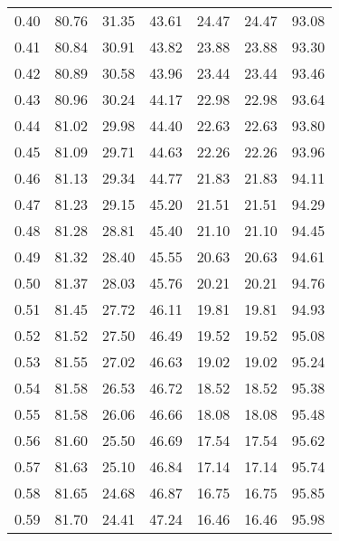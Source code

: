 \begin{tabular}{|c|c|c|c|c|c|c|}
      0.40 &     80.76 &     31.35 &      43.61 &   24.47 &      24.47 &         93.08 \\
      0.41 &     80.84 &     30.91 &      43.82 &   23.88 &      23.88 &         93.30 \\
      0.42 &     80.89 &     30.58 &      43.96 &   23.44 &      23.44 &         93.46 \\
      0.43 &     80.96 &     30.24 &      44.17 &   22.98 &      22.98 &         93.64 \\
      0.44 &     81.02 &     29.98 &      44.40 &   22.63 &      22.63 &         93.80 \\
      0.45 &     81.09 &     29.71 &      44.63 &   22.26 &      22.26 &         93.96 \\
      0.46 &     81.13 &     29.34 &      44.77 &   21.83 &      21.83 &         94.11 \\
      0.47 &     81.23 &     29.15 &      45.20 &   21.51 &      21.51 &         94.29 \\
      0.48 &     81.28 &     28.81 &      45.40 &   21.10 &      21.10 &         94.45 \\
      0.49 &     81.32 &     28.40 &      45.55 &   20.63 &      20.63 &         94.61 \\
      0.50 &     81.37 &     28.03 &      45.76 &   20.21 &      20.21 &         94.76 \\
      0.51 &     81.45 &     27.72 &      46.11 &   19.81 &      19.81 &         94.93 \\
      0.52 &     81.52 &     27.50 &      46.49 &   19.52 &      19.52 &         95.08 \\
      0.53 &     81.55 &     27.02 &      46.63 &   19.02 &      19.02 &         95.24 \\
      0.54 &     81.58 &     26.53 &      46.72 &   18.52 &      18.52 &         95.38 \\
      0.55 &     81.58 &     26.06 &      46.66 &   18.08 &      18.08 &         95.48 \\
      0.56 &     81.60 &     25.50 &      46.69 &   17.54 &      17.54 &         95.62 \\
      0.57 &     81.63 &     25.10 &      46.84 &   17.14 &      17.14 &         95.74 \\
      0.58 &     81.65 &     24.68 &      46.87 &   16.75 &      16.75 &         95.85 \\
      0.59 &     81.70 &     24.41 &      47.24 &   16.46 &      16.46 &         95.98 \\

\end{tabular}
